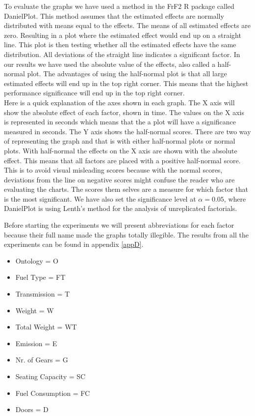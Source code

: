 \documentclass{llncs}
\begin{document}
To evaluate the graphs we have used a method in the \textsf{FrF2} R
package called \textsf{DanielPlot}. This method assumes that the
estimated effects are normally distributed with means equal to the
effects. The means of all estimated effects are zero. Resulting in a
plot where the estimated effect would end up on a straight line. This
plot is then testing whether all the estimated effects have the same
distribution. All deviations of the straight line indicates a
significant factor. In our results we have used the absolute value of
the effects, also called a half-normal plot. The advantages of using
the half-normal plot is that all large estimated effects will end up
in the top right corner. This means that the highest performance
significance will end up in
the top right corner.~\cite{Plotting} \\
Here is a quick explanation of the axes shown in each graph.  The X
axis will show the absolute effect of each factor, shown in time. The
values on the X axis is represented in seconds which means that the a
plot will have a significance measured in seconds.  The Y axis shows
the half-normal scores. There are two way of representing the graph
and that is with either half-normal plots or normal plots. With
half-normal the effects on the X axis are shown with the absolute
effect. This means that all factors are placed with a positive
half-normal score. This is to avoid visual misleading scores because
with the normal scores, deviations from the line on negative scores
might confuse the reader who are evaluating the charts.  The scores
them selves are a measure for which factor that is the most
significant.  We have also set  the significance level at $\alpha =
0.05$, where \textsf{DanielPlot} is using Lenth's method for the
analysis of unreplicated factorials. %

Before starting the experiments we will present
abbreviations for each factor because their full name made the graphs
totally illegible. The results from all the
experiments can be found in appendix \ref{appD}. %
\begin{itemize}
  \item Ontology = O
  \item Fuel Type = FT
  \item Transmission = T
  \item Weight = W
  \item Total Weight = WT
  \item Emission = E
  \item Nr. of Gears = G
  \item Seating Capacity = SC
  \item Fuel Consumption = FC
  \item Doors = D
\end{itemize}
\end{document}
